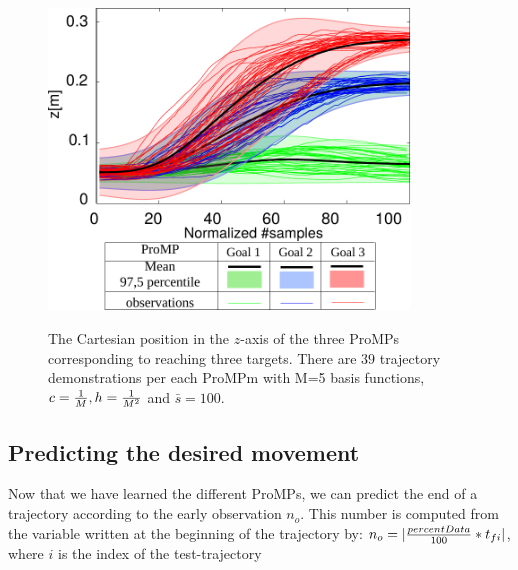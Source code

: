 \documentclass[utf8]{frontiersSCNS} %
\newcommand{\todo}[1]{\textcolor{red}{\textbf{/*#1*/}}}
\begin{document}

\begin{figure}[h]
\centering
{
\includegraphics[height=8cm]{img/3DOFtrajectoriesProMPs.pdf}
}
\caption{The Cartesian position in the $z$-axis of the three ProMPs corresponding to reaching three targets. There are $39$ trajectory demonstrations per each ProMPm with M=5 basis functions, $c={1 \over M}, h={1 \over M^2}$ and $\bar{s} = 100$.}
\label{fig:3TargetsZTrajectoriesProMP}
\end{figure}


\subsection{Predicting the desired movement}

Now that we have learned the different ProMPs, we can predict the end of a trajectory according to the early observation $n_o$.
This number is computed from the variable  written at the beginning of the trajectory by: $n_o= |{percentData \over 100}* t_{fi}|$, where $i$ is the index of the test-trajectory
\end{document}
